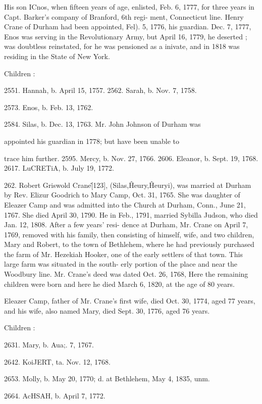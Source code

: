 \documentclass{book}
\begin{document}
His son ICnos, when fifteen years of age, enlisted, Feb. 6, 1777, 
for three years in Capt. Barker's company of Branford, 6th regi- 
ment, Connecticut line. Henry Crane of Durham had been 
appointed, Fel). 5, 1776, his guardian. Dec. 7, 1777, Enos was 
serving in the Revolutionary Army, but April 16, 1779, he 
deserted ; was doubtless reinstated, for he was pensioned as a 
inivate, and in 1818 was residing in the State of New York. 

Children : 

2551. Hannah, b. April 15, 1757. 
2562. Sarah, b. Nov. 7, 1758. 




2573. Enos, b. Feb. 13, 1762. 

2584. Silas, b. Dec. 13, 1763. Mr. John Johnson of Durham was 

appointed his guardian in 1778; but have been unable to 

trace him further. 
2595. Mercy, b. Nov. 27, 1766. 
2606. Eleanor, b. Sept. 19, 1768. 
2617. LuCRETiA, b. July 19, 1772. 

262. Robert Griswold Crane\^ [123], (Silas,\^ Heury,\^ 
Heuryi), was married at Durham by Rev. Elizur Goodrich to 
Mary Camp, Oct. 31, 1765. She was daughter of Eleazer Camp 
and was admitted into the Church at Durham, Conn., June 21, 
1767. She died April 30, 1790. He in Feb., 1791, married 
Sybilla Judson, who died Jan. 12, 1808. After a few years' resi- 
dence at Durham, Mr. Crane on April 7, 1769, removed with his 
family, then consisting of himself, wife, and two children, Mary 
and Robert, to the town of Bethlehem, where he had previously 
purchased the farm of Mr. Hezekiah Hooker, one of the early 
settlers of that town. This large farm was situated in the south- 
erly portion of the place and near the Woodbury line. Mr. 
Crane's deed was dated Oct. 26, 1768, Here the remaining 
children were born and here he died March 6, 1820, at the age 
of 80 years. 

Eleazer Camp, father of Mr. Crane's first wife, died Oct. 30, 
1774, aged 77 years, and his wife, also named Mary, died Sept. 
30, 1776, aged 76 years. 

Children : 

2631. Mary, b. Aua;. 7, 1767. 

2642. KoiJERT, ta. Nov. 12, 1768. 

2653. Molly, b. May 20, 1770; d. at Bethlehem, May 4, 1835, unm. 

2664. AcHSAH, b. April 7, 1772. 
\end{document}
